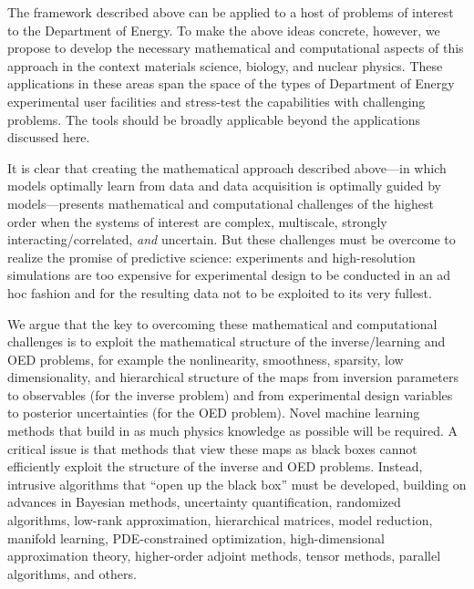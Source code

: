 \documentclass[11pt]{article}
\begin{document}
  The framework described above can be applied to a host of problems
  of interest to the Department of Energy.  To make the above ideas
  concrete, however, we propose to develop the necessary mathematical
  and computational aspects of this approach in the context materials
  science, biology, and nuclear physics.
These applications in these areas span the space of the types of
Department of Energy experimental user facilities and stress-test the
capabilities with challenging problems.  The tools should be broadly
applicable beyond the applications discussed here.

It is clear that creating the mathematical approach described
above---in which models optimally learn from data and data acquisition
is optimally guided by models---presents mathematical and
computational challenges of the highest order when the systems of
interest are complex, multiscale, strongly interacting/correlated, {\em and}
uncertain. But these challenges must be overcome to realize the
promise of predictive science: experiments and high-resolution
simulations are too expensive for experimental design to be conducted
in an ad hoc fashion and for the resulting data not to be exploited to
its very fullest.

We argue that the key to overcoming these mathematical and
computational challenges is to exploit the mathematical structure of
the inverse/learning and OED problems, for example the nonlinearity,
smoothness, sparsity, low dimensionality, and hierarchical structure
of the maps from inversion parameters to observables (for the inverse
problem) and from experimental design variables to posterior
uncertainties (for the OED problem).  Novel machine learning methods
that build in as much physics knowledge as possible will be required.
A critical issue is that methods that view these maps as black boxes
cannot efficiently exploit the structure of the inverse and OED
problems. Instead, intrusive algorithms that ``open up the black box''
must be developed, building on advances in Bayesian methods,
uncertainty quantification, randomized algorithms, low-rank
approximation, hierarchical matrices, model reduction, manifold
learning, PDE-constrained optimization, high-dimensional approximation
theory, higher-order adjoint methods, tensor methods, parallel
algorithms, and others.
\end{document}
